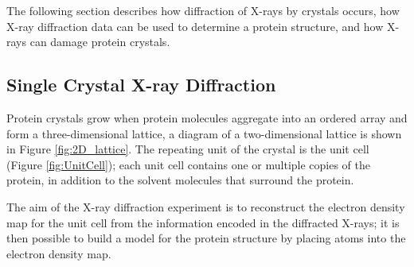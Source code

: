 The following section describes how diffraction of X-rays by crystals occurs, how X-ray diffraction data can be used to determine a protein structure, and how X-rays can damage protein crystals.
     
\subsection{Single Crystal X-ray Diffraction}
Protein crystals grow when protein molecules aggregate into an ordered array and form a three-dimensional lattice, a diagram of a two-dimensional lattice is shown in Figure \ref{fig:2D_lattice}. The repeating unit of the crystal is the unit cell (Figure \ref{fig:UnitCell}); each unit cell contains one or multiple copies of the protein, in addition to the solvent molecules that surround the protein.   

The aim of the X-ray diffraction experiment is to reconstruct the electron density map for the unit cell from the information encoded in the diffracted X-rays; it is then possible to build a model for the protein structure by placing atoms into the electron density map.  

